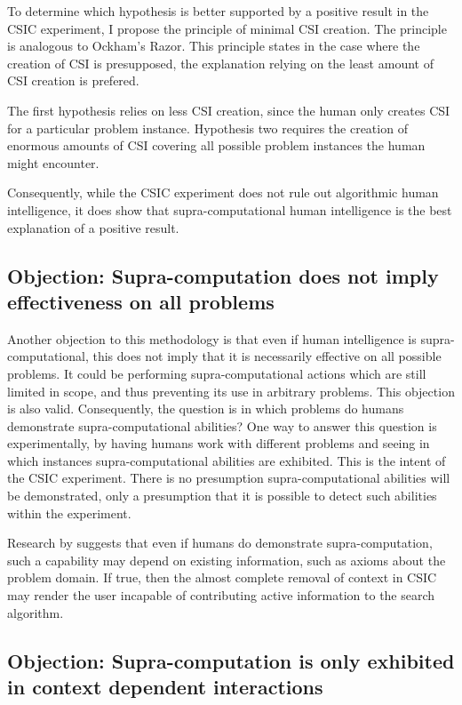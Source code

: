 To determine which hypothesis is better supported by a positive result in the CSIC experiment, I propose the principle of minimal CSI creation.  The principle is analogous to Ockham's Razor.  This principle states in the case where the creation of CSI is presupposed, the explanation relying on the least amount of CSI creation is prefered.

The first hypothesis relies on less CSI creation, since the human only creates CSI for a particular problem instance.  Hypothesis two requires the creation of enormous amounts of CSI covering all possible problem instances the human might encounter.

 Consequently, while the CSIC experiment does not rule out algorithmic human intelligence, it does show that supra-computational human intelligence is the best explanation of a positive result. 

\subsection{Objection: Supra-computation does not imply effectiveness on all problems}
Another objection to this methodology is that even if human intelligence is supra-computational, this does not imply that it is necessarily effective on all possible problems.  It could be performing supra-computational actions which are still limited in scope, and thus preventing its use in arbitrary problems. This objection is also valid.  Consequently, the question is in which problems do humans demonstrate supra-computational abilities?  One way to answer this question is experimentally, by having humans work with different problems and seeing in which instances supra-computational abilities are exhibited.  This is the intent of the CSIC experiment.  There is no presumption supra-computational abilities will be demonstrated, only a presumption that it is possible to detect such abilities within the experiment. 

Research by \citet{bartlett11:_using_turin_oracl_in_cognit_model} suggests that even if humans do demonstrate supra-computation, such a capability may depend on existing information, such as axioms about the problem domain.  If true, then the almost complete removal of context in CSIC may render the user incapable of contributing active information to the search algorithm.

\subsection{Objection: Supra-computation is only exhibited in context dependent interactions}

